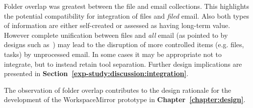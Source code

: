 Folder overlap was greatest between the file and email collections. This highlights the potential compatibility for integration of files and \textit{filed} email. Also both types of information are either self-created or assessed as having long-term value.  However complete unification between files and \textit{all} email (as pointed to by designs such as~\citep{Bellotti:03}) may lead to the disruption of more controlled items (e.g. files, tasks) by unprocessed email. In some cases it may be appropriate not to integrate, but to instead retain tool separation.  Further design implications are presented in \textbf{Section~\ref{exp-study:discussion:integration}}.

The observation of folder overlap contributes to the design rationale for the development of the WorkspaceMirror prototype in \textbf{Chapter~\ref{chapter:design}}. %




